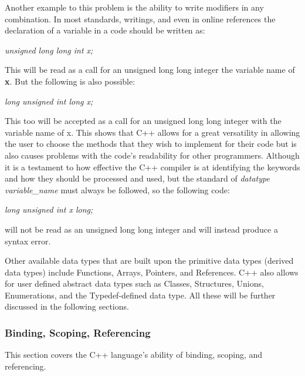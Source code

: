 \documentclass[12pt]{article}
\begin{document}
Another example to this problem is the ability to write modifiers in any combination. In most standards, writings, and even in online references the declaration of a variable in a code should be written as:
\begin{center}
  \textit{unsigned long long int x;}
\end{center}

This will be read as a call for an unsigned long long integer the variable name of \textbf{x}. But the following is also possible:
\begin{center}
  \textit{long unsigned int long x;}
\end{center}

This too will be accepted as a call for an unsigned long long integer with the variable name of x. This shows that C++ allows for a great versatility in allowing the user to choose the methods that they wish to implement for their code but is also causes problems with the code's readability for other programmers. Although it is a testament to how effective the C++ compiler is at identifying the keywords and how they should be processed and used, but the standard of \textit{datatype variable\_name} must always be followed, so the following code:
\begin{center}
  \textit{long unsigned int x long;}
\end{center}
will not be read as an unsigned long long integer and will instead produce a syntax error.

Other available data types that are built upon the primitive data types (derived data types) include Functions, Arrays, Pointers, and References.
C++ also allows for user defined abstract data types such as Classes, Structures, Unions, Enumerations, and the Typedef-defined data type. All these will be further discussed in the following sections. 

\subsubsection{Binding, Scoping, Referencing}
This section covers the C++ language's ability of binding, scoping, and referencing.
\end{document}
